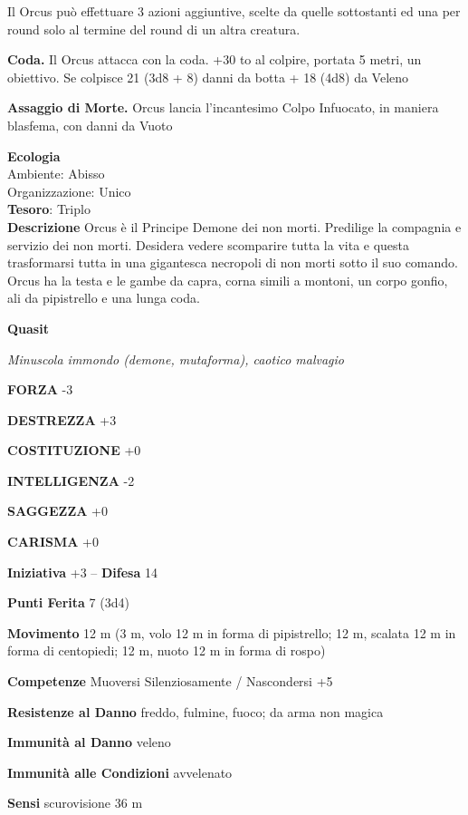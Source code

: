 \begin{multicols}{2}
	Il Orcus può effettuare 3 azioni aggiuntive, scelte da quelle sottostanti ed una per round solo al termine del round di un altra creatura.

	\textbf{Coda.} Il Orcus attacca con la coda. +30 to al colpire, portata 5 metri, un obiettivo. Se colpisce 21 (3d8 + 8) danni da botta + 18 (4d8) da Veleno

	\textbf{Assaggio di Morte.} Orcus lancia l'incantesimo Colpo Infuocato, in maniera blasfema, con danni da Vuoto

	\textbf{Ecologia}\\
	Ambiente: Abisso\\
	Organizzazione: Unico\\
	\textbf{Tesoro}: Triplo\\

	\textbf{Descrizione}
	Orcus è il Principe Demone dei non morti. Predilige la compagnia e servizio dei non morti. Desidera vedere scomparire tutta la vita e questa trasformarsi tutta in una gigantesca necropoli di non morti sotto il suo comando. Orcus ha la testa e le gambe da capra, corna simili a montoni, un corpo gonfio, ali da pipistrello e una lunga coda.


	\medskip{}\textbf{Quasit}

	\textit{Minuscola immondo (demone, mutaforma), caotico malvagio}

	\textbf{FORZA} -3

	\textbf{DESTREZZA} +3

	\textbf{COSTITUZIONE} +0

	\textbf{INTELLIGENZA} -2

	\textbf{SAGGEZZA} +0

	\textbf{CARISMA} +0

	\textbf{Iniziativa} +3 -- \textbf{Difesa} 14

	\textbf{Punti Ferita} 7 (3d4)

	\textbf{Movimento} 12 m (3 m, volo 12 m in forma di pipistrello; 12 m, scalata 12 m in forma di centopiedi; 12 m, nuoto 12 m in forma di rospo)

	\textbf{Competenze} Muoversi Silenziosamente / Nascondersi +5

	\textbf{Resistenze al Danno} freddo, fulmine, fuoco; da arma non magica

	\textbf{Immunità al Danno} veleno

	\textbf{Immunità alle Condizioni}
	avvelenato

	\textbf{Sensi} scurovisione 36 m


\end{multicols}
